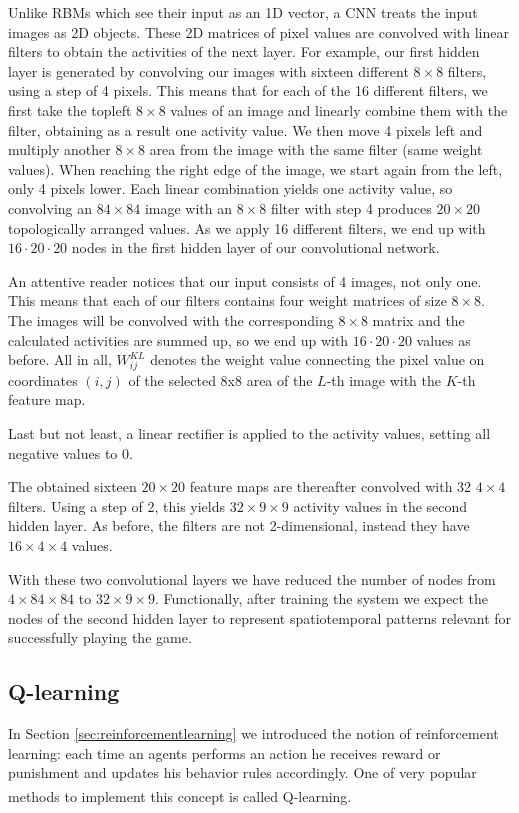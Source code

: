\documentclass[a4paper,12pt]{article}
\begin{document}
Unlike RBMs which see their input as an 1D vector, a CNN treats the input images as 2D objects. These 2D matrices of pixel values are convolved with linear filters to obtain the activities of the next layer. For example, our first hidden layer is generated by convolving our images with sixteen different $8 \times 8$ filters, using a step of 4 pixels. This means that for each of the 16 different filters, we first take the topleft $8 \times 8$ values of an image and linearly combine them with the filter, obtaining as a result one activity value. We then move 4 pixels left and multiply another $8  \times 8$ area from the image with the same filter (same weight values). When reaching the right edge of the image, we start again from the left, only 4 pixels lower. Each linear combination yields one activity value, so convolving an $84  \times 84$ image with an $8 \times 8$ filter with step 4 produces $20 \times 20$ topologically arranged values. As we apply 16 different filters, we end up with $16 \cdot 20 \cdot 20$ nodes in the first hidden layer of our convolutional network.

An attentive reader notices that our input consists of 4 images, not only one. This means that each of our filters contains four weight matrices of size $8 \times 8$. The images will be convolved with the corresponding $8 \times 8$ matrix and the calculated activities are summed up, so we end up with $16 \cdot 20 \cdot 20$ values as before. All in all, $W^{KL}_{ij}$ denotes the weight value connecting the pixel value on coordinates $(i,j)$ of the selected 8x8 area of the $L$-th image with the $K$-th feature map.

Last but not least, a linear rectifier is applied to the activity values, setting all negative values to 0.

The obtained sixteen $20 \times 20$ feature maps are thereafter convolved with 32 $4 \times 4$ filters. Using a step of 2, this yields $32 \times 9 \times 9$ activity values in the second hidden layer. As before, the filters are not 2-dimensional, instead they have $16 \times 4 \times 4$ values.

With these two convolutional layers we have reduced the number of nodes from $4 \times 84 \times 84$ to $32 \times 9 \times 9$. Functionally, after training the system we expect the nodes of the second hidden layer to represent spatiotemporal patterns relevant for successfully playing the game.


\subsection{Q-learning}
In Section \ref{sec:reinforcementlearning} we introduced the notion of reinforcement learning: each time an agents performs an action he receives reward or punishment and updates his behavior rules accordingly. One of very popular methods to implement this concept is called Q-learning\textsuperscript{\cite{watkins1992q}}.
\end{document}

